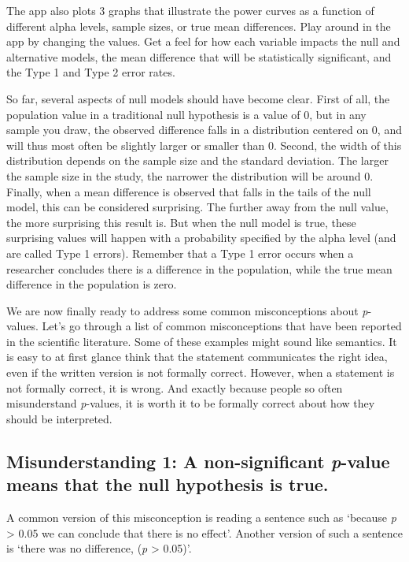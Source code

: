 \documentclass[
  oneside]{krantz}
\begin{document}
The app also plots 3 graphs that illustrate the power curves as a function of different alpha levels, sample sizes, or true mean differences. Play around in the app by changing the values. Get a feel for how each variable impacts the null and alternative models, the mean difference that will be statistically significant, and the Type 1 and Type 2 error rates.

So far, several aspects of null models should have become clear. First of all, the population value in a traditional null hypothesis is a value of 0, but in any sample you draw, the observed difference falls in a distribution centered on 0, and will thus most often be slightly larger or smaller than 0. Second, the width of this distribution depends on the sample size and the standard deviation. The larger the sample size in the study, the narrower the distribution will be around 0. Finally, when a mean difference is observed that falls in the tails of the null model, this can be considered surprising. The further away from the null value, the more surprising this result is. But when the null model is true, these surprising values will happen with a probability specified by the alpha level (and are called Type 1 errors). Remember that a Type 1 error occurs when a researcher concludes there is a difference in the population, while the true mean difference in the population is zero.

We are now finally ready to address some common misconceptions about \emph{p}-values. Let's go through a list of common misconceptions that have been reported in the scientific literature. Some of these examples might sound like semantics. It is easy to at first glance think that the statement communicates the right idea, even if the written version is not formally correct. However, when a statement is not formally correct, it is wrong. And exactly because people so often misunderstand \emph{p}-values, it is worth it to be formally correct about how they should be interpreted.

\hypertarget{misconception1}{%
\subsection{\texorpdfstring{Misunderstanding 1: A non-significant \emph{p}-value means that the null hypothesis is true.}{Misunderstanding 1: A non-significant p-value means that the null hypothesis is true.}}\label{misconception1}}

A common version of this misconception is reading a sentence such as `because \emph{p} \textgreater{} 0.05 we can conclude that there is no effect'. Another version of such a sentence is `there was no difference, (\emph{p} \textgreater{} 0.05)'.
\end{document}
